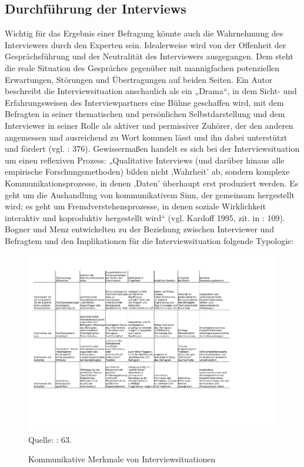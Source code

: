 \subsection{Durchführung der Interviews} 
Wichtig für das Ergebnis einer Befragung könnte auch die Wahrnehmung des Interviewers durch den Experten sein. Idealerweise wird von der Offenheit der Gesprächsführung und der Neutralität des Interviewers ausgegangen. Dem steht die reale Situation des Gespräches gegenüber mit mannigfachen potenziellen Erwartungen, Störungen und Übertragungen auf beiden Seiten. Ein Autor beschreibt die Interviewsituation anschaulich als ein „Drama“, in dem Sicht- und Erfahrungsweisen des Interviewpartners eine Bühne geschaffen wird, mit dem Befragten in seiner thematischen und persönlichen Selbstdarstellung und dem Interviewer in seiner Rolle als aktiver und permissiver Zuhörer, der den anderen angemessen und ausreichend zu Wort kommen lässt und ihn dabei unterstützt und fördert (vgl. \cite{herm00}: 376). Gewissermaßen handelt es sich bei der Interviewsituation um einen reflexiven Prozess: „Qualitative Interviews (und darüber hinaus alle empirische Forschungsmethoden) bilden nicht ‚Wahrheit’ ab, sondern komplexe Kommunikationsprozesse, in denen ‚Daten’ überhaupt erst produziert werden. Es geht um die Aushandlung von kommunikativem Sinn, der gemeinsam hergestellt wird; es geht um Fremdverstehensprozesse, in denen soziale Wirklichkeit interaktiv und koproduktiv hergestellt wird“ (vgl. Kardoff 1995, zit. in \cite{kruse}: 109). Bogner und Menz entwickelten zu der Beziehung zwischen Interviewer und Befragtem und den Implikationen für die Interviewsituation folgende Typologie:
\begin{figure}[H]
\caption{Kommunikative Merkmale von Interviewsituationen}
\includegraphics[width=7in,trim=0 100 0 0]{Material/Interviewsituationen.pdf}
\scriptsize{Quelle: \cite{bogmenz}: 63.}
\end{figure}

